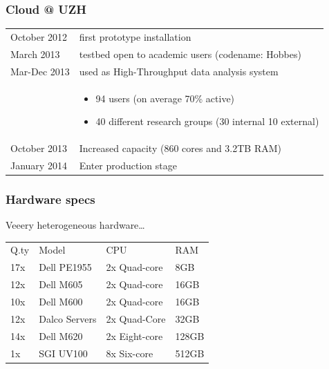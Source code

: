 \documentclass[english,serif,mathserif,xcolor=pdftex,dvipsnames,table]{beamer}
\begin{document}
\begin{frame}
  \frametitle{Cloud @ UZH}

  \begin{tabular}{lp{7cm}}
    {\color{Blue}October 2012} & first prototype installation \\
    {\color{Blue}March 2013} & testbed open to academic users
    (codename: {\color{Blue}Hobbes}) \\
  {\color{Blue}Mar-Dec 2013} & used as
    {\color{Blue}High-Throughput} data analysis system\\
    & \scriptsize{
    \begin{itemize}
      \item {\color{Blue}94 users} (on average 70\% active)
      \item {\color{Blue}40 different} research groups (30 internal 10
    external) 
  \end{itemize}} \\
  {\color{Blue}October 2013} &Increased capacity (860 cores
  and 3.2TB RAM)\\
  {\color{Blue}January 2014} &Enter production stage\\
  \end{tabular}
\end{frame}

\begin{frame}[fragile]
  \frametitle{Hardware specs}
  
  Veeery heterogeneous hardware\dots
  
  \small{
    \begin{center}
      \begin{tabular}{llll}
        Q.ty	& Model	& CPU	& RAM \\
        17x	& Dell PE1955	& 2x Quad-core	& 8GB \\
        12x	& Dell M605	& 2x Quad-core 	& 16GB \\
        10x	& Dell M600	& 2x Quad-core 	& 16GB \\
        12x	& Dalco Servers	& 2x Quad-Core 	& 32GB \\
        14x	& Dell M620	& 2x Eight-core & 128GB \\
        1x	& SGI UV100	& 8x Six-core 	& 512GB \\
      \end{tabular}
    \end{center}
  }
\end{frame}
\end{document}
